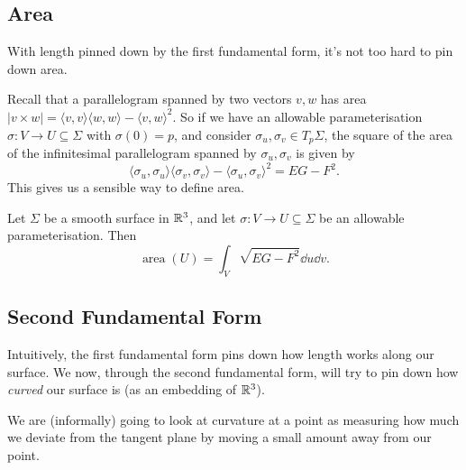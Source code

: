 \documentclass[a4paper]{article}
\begin{document}
\subsection{Area}

With length pinned down by the first fundamental form, it's not too hard to pin down area. 

Recall that a parallelogram spanned by two vectors $v, w$ has area $|v \times w| = \langle v, v \rangle \langle w, w \rangle - \langle v, w \rangle^2$. So if we have an allowable parameterisation $\sigma: V \rightarrow U \subseteq \Sigma$ with $\sigma(0) = p$, and consider $\sigma_u, \sigma_v \in T_p \Sigma$, the square of the area of the infinitesimal parallelogram spanned by $\sigma_u, \sigma_v$ is given by
$$
\langle \sigma_u, \sigma_u \rangle \langle \sigma_v, \sigma_v \rangle - \langle \sigma_u, \sigma_v \rangle^2 = EG - F^2.
$$
This gives us a sensible way to define area.

\begin{definition}[Area]
    Let $\Sigma$ be a smooth surface in $\mathbb{R}^3$, and let $\sigma: V \rightarrow U \subseteq \Sigma$ be an allowable parameterisation. Then
    $$
\operatorname{area}(U) = \int_V \sqrt{EG - F^2} \dd u \dd v.
    $$
\end{definition}

\subsection{Second Fundamental Form}


Intuitively, the first fundamental form pins down how length works along our surface. We now, through the second fundamental form, will try to pin down how \emph{curved} our surface is (as an embedding of $\mathbb{R}^3$).

We are (informally) going to look at curvature at a point as measuring how much we deviate from the tangent plane by moving a small amount away from our point.
\end{document}
